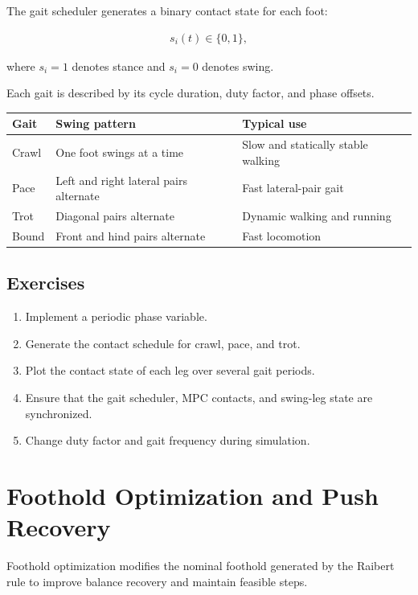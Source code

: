 \documentclass[11pt,a4paper]{article}
\begin{document}
The gait scheduler generates a binary contact state for each foot:

\begin{align*}
	s_i(t) \in \{0,1\},
\end{align*}

where \(s_i=1\) denotes stance and \(s_i=0\) denotes swing.

Each gait is described by its cycle duration, duty factor, and phase offsets.

\begin{table}[h]
	\centering
	\begin{tabular}{lll}
		\toprule
		Gait & Swing pattern & Typical use \\
		\midrule
		Crawl & One foot swings at a time & Slow and statically stable walking \\
		Pace & Left and right lateral pairs alternate & Fast lateral-pair gait \\
		Trot & Diagonal pairs alternate & Dynamic walking and running \\
		Bound & Front and hind pairs alternate & Fast locomotion \\
		\bottomrule
	\end{tabular}
\end{table}

\subsection*{Exercises}

\begin{enumerate}[label=\arabic*.]
	\item Implement a periodic phase variable.
	\item Generate the contact schedule for crawl, pace, and trot.
	\item Plot the contact state of each leg over several gait periods.
	\item Ensure that the gait scheduler, MPC contacts, and swing-leg state are synchronized.
	\item Change duty factor and gait frequency during simulation.
\end{enumerate}

\section{Foothold Optimization and Push Recovery}

Foothold optimization modifies the nominal foothold generated by the Raibert rule to improve balance recovery and maintain feasible steps.
\end{document}
